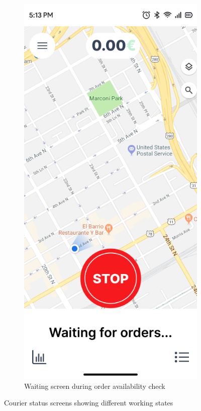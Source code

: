 \begin{figure}[H]
\begin{subfigure}[b]{0.48\textwidth}
        \label{fig:go_screen}
    \end{subfigure}
    \hfill
    \begin{subfigure}[b]{0.48\textwidth}
        \centering
        \includegraphics[width=\textwidth]{images/waiting_screen.png}
        \caption{Waiting screen during order availability check}
        \label{fig:waiting_screen}
    \end{subfigure}
    \caption{Courier status screens showing different working states}
    \label{fig:courier_status1}
\end{figure}

